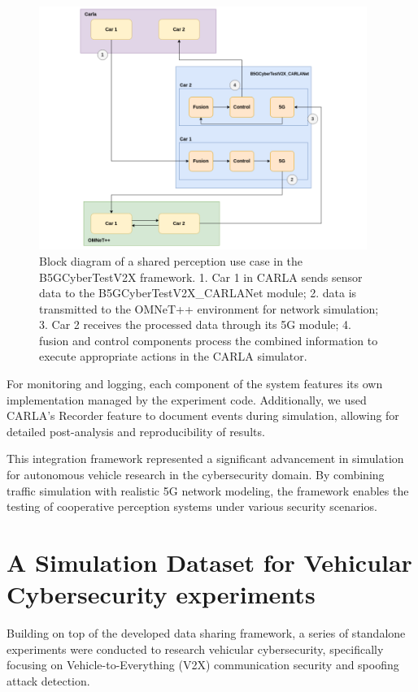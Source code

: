 \begin{figure} [!ht]
    \centering
    \includegraphics[width=0.95\textwidth]{parts/figuras/B5GCyberTestV2X_use_case.png}
    \caption{Block diagram of a shared perception use case in the B5GCyberTestV2X framework. 1. Car 1 in CARLA sends sensor data to the B5GCyberTestV2X\_CARLANet module; 2. data is transmitted to the OMNeT++ environment for network simulation; 3. Car 2 receives the processed data through its 5G module; 4. fusion and control components process the combined information to execute appropriate actions in the CARLA simulator.}
    \label{fig:B5GCyberTestV2X-use-case}
\end{figure}

For monitoring and logging, each component of the system features its own implementation managed by the experiment code. Additionally, we used CARLA's Recorder feature to document events during simulation, allowing for detailed post-analysis and reproducibility of results. 

This integration framework represented a significant advancement in simulation for autonomous vehicle research in the cybersecurity domain. By combining traffic simulation with realistic 5G network modeling, the framework enables the testing of cooperative perception systems under various security scenarios.

\section{A Simulation Dataset for Vehicular Cybersecurity experiments}

Building on top of the developed data sharing framework, a series of standalone experiments were conducted to research vehicular cybersecurity, specifically focusing on Vehicle-to-Everything (V2X) communication security and spoofing attack detection.

